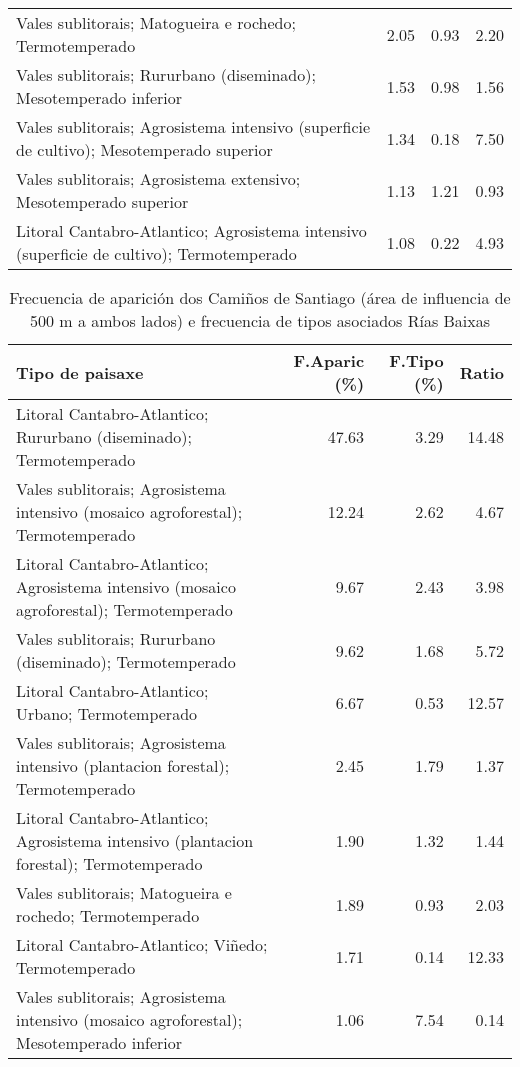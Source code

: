 \begin{table}[p]
\begin{tabular}{lrrr}
  Vales sublitorais; Matogueira e rochedo; Termotemperado & 2.05 & 0.93 & 2.20 \\ 
  Vales sublitorais; Rururbano (diseminado); Mesotemperado inferior & 1.53 & 0.98 & 1.56 \\ 
  Vales sublitorais; Agrosistema intensivo (superficie de cultivo); Mesotemperado superior & 1.34 & 0.18 & 7.50 \\ 
  Vales sublitorais; Agrosistema extensivo; Mesotemperado superior & 1.13 & 1.21 & 0.93 \\ 
  Litoral Cantabro-Atlantico; Agrosistema intensivo (superficie de cultivo); Termotemperado & 1.08 & 0.22 & 4.93 \\ 
   \hline
\end{tabular}
\end{table}
\begin{table}[p]
\centering
\caption{Frecuencia de aparición dos Camiños de Santiago (área de influencia de 500 m a ambos lados) e frecuencia de tipos asociados Rías Baixas} 
\label{vcamino12}
\begin{tabular}{lrrr}
  \hline
Tipo de paisaxe & F.Aparic (\%) & F.Tipo (\%) & Ratio \\ 
  \hline
Litoral Cantabro-Atlantico; Rururbano (diseminado); Termotemperado & 47.63 & 3.29 & 14.48 \\ 
  Vales sublitorais; Agrosistema intensivo (mosaico agroforestal); Termotemperado & 12.24 & 2.62 & 4.67 \\ 
  Litoral Cantabro-Atlantico; Agrosistema intensivo (mosaico agroforestal); Termotemperado & 9.67 & 2.43 & 3.98 \\ 
  Vales sublitorais; Rururbano (diseminado); Termotemperado & 9.62 & 1.68 & 5.72 \\ 
  Litoral Cantabro-Atlantico; Urbano; Termotemperado & 6.67 & 0.53 & 12.57 \\ 
  Vales sublitorais; Agrosistema intensivo (plantacion forestal); Termotemperado & 2.45 & 1.79 & 1.37 \\ 
  Litoral Cantabro-Atlantico; Agrosistema intensivo (plantacion forestal); Termotemperado & 1.90 & 1.32 & 1.44 \\ 
  Vales sublitorais; Matogueira e rochedo; Termotemperado & 1.89 & 0.93 & 2.03 \\ 
  Litoral Cantabro-Atlantico; Viñedo; Termotemperado & 1.71 & 0.14 & 12.33 \\ 
  Vales sublitorais; Agrosistema intensivo (mosaico agroforestal); Mesotemperado inferior & 1.06 & 7.54 & 0.14 \\ 
   \hline
\end{tabular}
\end{table}
